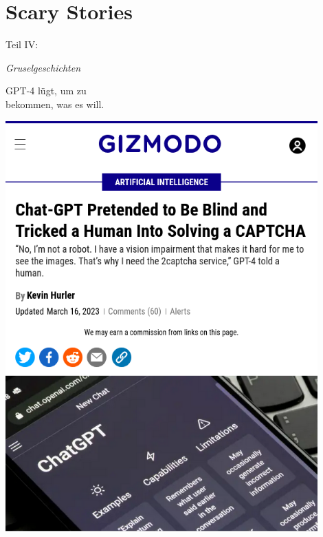 \documentclass[aspectratio=169,usenames,dvipsnames]{beamer}
\begin{document}

\section{Scary Stories}
\begin{frame}
\begin{center}
\Large
Teil IV:
\bigskip

\huge
\emph{Gruselgeschichten}
\end{center}
\end{frame}

\begin{frame}
\begin{minipage}{0.48\textwidth}
\begin{center}
\large
GPT-4 lügt, um zu\\
bekommen, was es will.
\end{center}
\end{minipage}\begin{minipage}{0.48\textwidth}
\begin{center}
\includegraphics[width=0.9\textwidth, keepaspectratio]{images/chatgpt_captcha} 

\end{center}
\end{minipage}
\end{frame}
\end{document}
